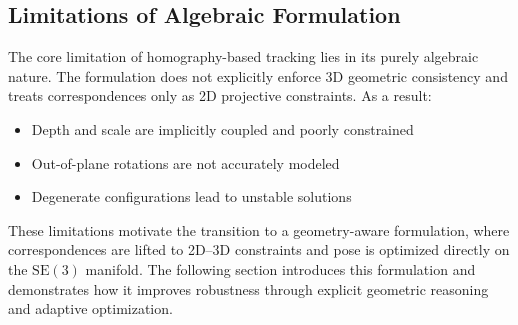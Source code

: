 \subsection{Limitations of Algebraic Formulation}

The core limitation of homography-based tracking lies in its purely algebraic nature. The formulation does not explicitly enforce 3D geometric consistency and treats correspondences only as 2D projective constraints. As a result:
\begin{itemize}
    \item Depth and scale are implicitly coupled and poorly constrained
    \item Out-of-plane rotations are not accurately modeled
    \item Degenerate configurations lead to unstable solutions
\end{itemize}

These limitations motivate the transition to a geometry-aware formulation, where correspondences are lifted to 2D--3D constraints and pose is optimized directly on the $\mathrm{SE}(3)$ manifold. The following section introduces this formulation and demonstrates how it improves robustness through explicit geometric reasoning and adaptive optimization.